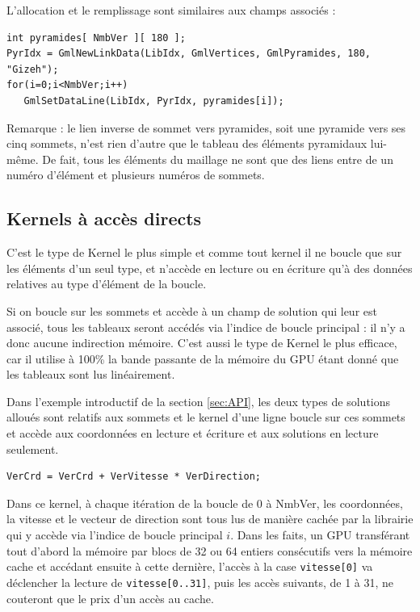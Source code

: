 \documentclass[a4paper,12pt]{article}
\begin{document}
L'allocation et le remplissage sont similaires aux champs associés :

\begin{tt}
\begin{verbatim}
int pyramides[ NmbVer ][ 180 ];
PyrIdx = GmlNewLinkData(LibIdx, GmlVertices, GmlPyramides, 180, "Gizeh");
for(i=0;i<NmbVer;i++)
   GmlSetDataLine(LibIdx, PyrIdx, pyramides[i]);
\end{verbatim}
\end{tt}
\normalfont

Remarque : le lien inverse de sommet vers pyramides, soit une pyramide vers ses cinq sommets, n'est rien d'autre que le tableau des éléments pyramidaux lui-même.
De fait, tous les éléments du maillage ne sont que des liens entre de un numéro d'élément et plusieurs numéros de sommets.

\subsection{Kernels à accès directs}
\label{sec:kernels_directs}
C'est le type de Kernel le plus simple et comme tout kernel il ne boucle que sur les éléments d'un seul type, et n'accède en lecture ou en écriture qu'à des données relatives au type d'élément de la boucle.

Si on boucle sur les sommets et accède à un champ de solution qui leur est associé, tous les tableaux seront accédés via l'indice de boucle principal : il n'y a donc aucune indirection mémoire.
C'est aussi le type de Kernel le plus efficace, car il utilise à 100\% la bande passante de la mémoire du GPU étant donné que les tableaux sont lus linéairement.

Dans l'exemple introductif de la section \ref{sec:API}, les deux types de solutions alloués sont relatifs aux sommets et le kernel d'une ligne boucle sur ces sommets et accède aux coordonnées en lecture et écriture et aux solutions en lecture seulement.

\begin{tt}
\begin{verbatim}
VerCrd = VerCrd + VerVitesse * VerDirection;
\end{verbatim}
\end{tt}
\normalfont

Dans ce kernel, à chaque itération de la boucle de 0 à NmbVer, les coordonnées, la vitesse et le vecteur de direction sont tous lus de manière cachée par la librairie qui y accède via l'indice de boucle principal $i$.
Dans les faits, un GPU transférant tout d'abord la mémoire par blocs de 32 ou 64 entiers consécutifs vers la mémoire cache et accédant ensuite à cette dernière, l'accès à la case {\tt vitesse[0]} va déclencher la lecture de {\tt vitesse[0..31]}, puis les accès suivants, de 1 à 31, ne couteront que le prix d'un accès au cache.
\end{document}
